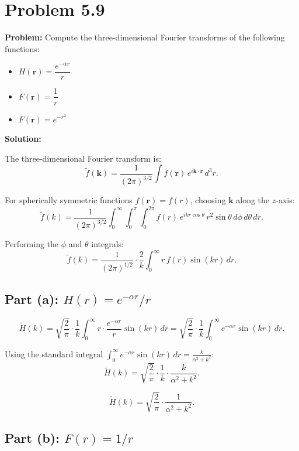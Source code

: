 \documentclass[12pt]{article}
\begin{document}
\section*{Problem 5.9}

\textbf{Problem:} Compute the three-dimensional Fourier transforms of the following functions:

\begin{itemize}
\item[(a)] $H(\mathbf{r}) = \dfrac{e^{-\alpha r}}{r}$
\item[(b)] $F(\mathbf{r}) = \dfrac{1}{r}$ 
\item[(c)] $F(\mathbf{r}) = e^{-r^2}$ 
\end{itemize}

\bigskip
\textbf{Solution:}

The three-dimensional Fourier transform is:
\[
\tilde{f}(\mathbf{k}) = \frac{1}{(2\pi)^{3/2}}\int f(\mathbf{r})\,e^{i\mathbf{k}\cdot\mathbf{r}}\,d^3r.
\]

For spherically symmetric functions $f(\mathbf{r}) = f(r)$, choosing $\mathbf{k}$ along the $z$-axis:
\[
\tilde{f}(k) = \frac{1}{(2\pi)^{3/2}}\int_0^{\infty}\int_0^{\pi}\int_0^{2\pi} f(r)\,e^{ikr\cos\theta}\,r^2\sin\theta\,d\phi\,d\theta\,dr.
\]

Performing the $\phi$ and $\theta$ integrals:
\[
\tilde{f}(k) = \frac{1}{(2\pi)^{1/2}}\cdot\frac{2}{k}\int_0^{\infty} r\,f(r)\sin(kr)\,dr.
\]

\subsection*{Part (a): $H(r) = e^{-\alpha r}/r$}

\[
\tilde{H}(k) = \sqrt{\frac{2}{\pi}}\cdot\frac{1}{k}\int_0^{\infty} r\cdot\frac{e^{-\alpha r}}{r}\sin(kr)\,dr = \sqrt{\frac{2}{\pi}}\cdot\frac{1}{k}\int_0^{\infty} e^{-\alpha r}\sin(kr)\,dr.
\]

Using the standard integral $\int_0^{\infty}e^{-\alpha r}\sin(kr)\,dr = \frac{k}{\alpha^2 + k^2}$:
\[
\tilde{H}(k) = \sqrt{\frac{2}{\pi}}\cdot\frac{1}{k}\cdot\frac{k}{\alpha^2+k^2}.
\]

\[
\boxed{\tilde{H}(k) = \sqrt{\frac{2}{\pi}}\cdot\frac{1}{\alpha^2 + k^2}.}
\]

\subsection*{Part (b): $F(r) = 1/r$}
\end{document}
